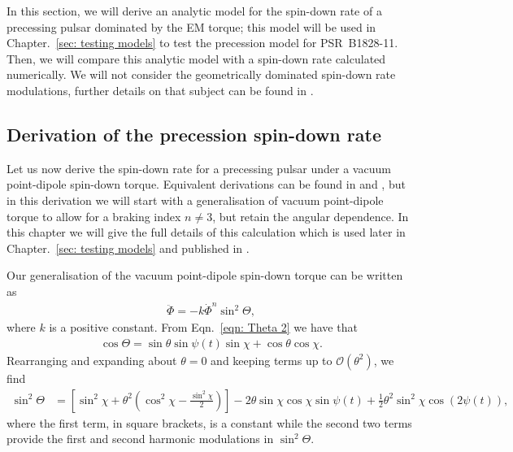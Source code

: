\documentclass[../full_thesis/full_thesis.tex]{subfiles}
\begin{document}
In this section, we will derive an analytic model for the spin-down rate of a
precessing pulsar dominated by the EM torque; this model will be used in
Chapter.~\ref{sec: testing models} to test the precession model for
PSR~B1828-11. Then, we will compare this analytic model with a spin-down rate
calculated numerically. We will not consider the geometrically dominated
spin-down rate modulations, further details on that subject can be found in
\citet{Jones2001}.

\subsection{Derivation of the precession spin-down rate}
\label{sec: derivation of the spin-down rate}
Let us now derive the spin-down rate for a precessing pulsar under a vacuum
point-dipole spin-down torque. Equivalent derivations can be found in
\citet{Link2001} and \citet{Jones2001}, but in this derivation we will start
with a generalisation of vacuum point-dipole torque to allow for a braking
index $n\ne3$, but retain the angular dependence. In this chapter we will give
the full details of this calculation which is used later in Chapter.~\ref{sec:
testing models} and published in \citet{Ashton2016}.

Our generalisation of the vacuum point-dipole spin-down torque can be written as
\begin{align}
\ddot{\Phi} = -k \dot{\Phi}^{n} \sin^{2}\Theta,
\label{eqn: EM DE}
\end{align}
where $k$ is a positive constant. From Eqn.~\eqref{eqn: Theta 2} we have that
\begin{align}
\cos\Theta = \sin\theta \sin \psi(t) \sin \chi + \cos\theta \cos\chi.
\end{align}
Rearranging and expanding about $\theta = 0$ and keeping terms up to
$\mathcal{O}(\theta^{2})$, we find
\begin{align}
\sin^{2}\Theta & =
\left[
\sin^{2}\chi + \theta^{2}\left(\cos^{2}\chi - \frac{\sin^{2}\chi}{2}\right)
\right]
- 2\theta \sin\chi\cos\chi \sin\psi(t)
 + \frac{1}{2}\theta^{2}\sin^{2}\chi\cos(2\psi(t)),
\label{eqn: sin 2 Theta}
\end{align}
where the first term, in square brackets, is a constant while the second two
terms provide the first and second harmonic modulations in $\sin^{2}\Theta$.
\end{document}
